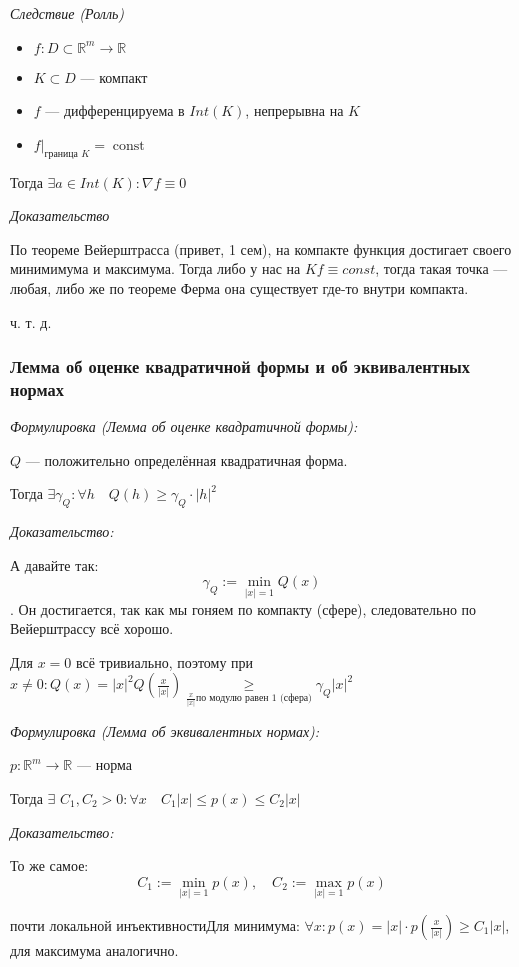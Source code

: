 \documentclass{article}
\def\dbl{\,\,}
\DeclareMathOperator{\const}{const}
\begin{document}
\textit{Следствие (Ролль)}
\begin{itemize}
    \item $f: D \subset \mathbb{R}^m \rightarrow \mathbb{R}$
    \item $K \subset D$ --- компакт
    \item $f$ --- дифференцируема в $Int(K)$, непрерывна на $K$
    \item $f|_{\text{граница }K} = \const$
\end{itemize}

Тогда $\exists a \in Int(K): \nabla f \equiv 0$

\textit{Доказательство}

По теореме Вейерштрасса (привет, 1 сем), на компакте функция достигает своего минимимума и максимума.
Тогда либо у нас на $K f \equiv const$, тогда такая точка --- любая, либо же по теореме Ферма она существует где-то внутри компакта.

ч. т. д.



\subsubsection{Лемма об оценке квадратичной формы и об эквивалентных нормах}
\textit{Формулировка (Лемма об оценке квадратичной формы):}

$Q$ --- положительно определённая квадратичная форма.

Тогда $\exists \gamma_Q: \forall h \quad Q(h) \ge \gamma_Q \cdot |h|^2$

\textit{Доказательство:}

А давайте так: $$\gamma_Q := \min_{|x| = 1}{Q(x)}$$. Он достигается, так как мы гоняем по компакту (сфере), следовательно по Вейерштрассу всё хорошо.

Для $x = 0$ всё тривиально, поэтому при $x \neq 0: Q(x) = |x|^2Q(\frac{x}{|x|}) \underset{\frac{x}{|x|}\text{по модулю равен 1 (сфера)}}{\ge} \gamma_Q|x|^2$

\textit{Формулировка (Лемма об эквивалентных нормах):}

$p: \mathbb{R}^m \rightarrow \mathbb{R}$ --- норма

Тогда $\exists \dbl C_1, C_2 > 0: \forall x \quad C_1|x| \le p(x) \le C_2|x|$

\textit{Доказательство:}

То же самое: $$C_1 := \min_{|x| = 1}{p(x)}, \quad C_2 := \max_{|x| = 1}{p(x)}$$

почти локальной инъективностиДля минимума: $\forall x: p(x) = |x| \cdot p(\frac{x}{|x|}) \ge C_1|x|$, для максимума аналогично.
\end{document}
